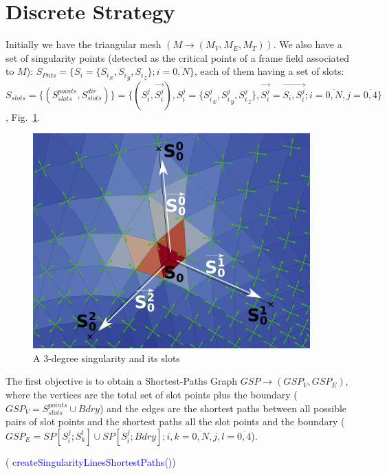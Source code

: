 \documentclass[a4paper]{report}
\begin{document}
\section{Discrete Strategy}
{
Initially we have the triangular mesh $(M \rightarrow (M_V, M_E, M_T))$. We also have a set of singularity points (detected as the critical points of a frame field associated to $M$): $S_{Pnts} = \{S_i = \{{S_i}_x, {S_i}_y, {S_i}_z \}; i=\overline{0,N}\}$, each of them having a set of slots: $S_{slots} = \{(S_{slots}^{points} , S_{slots}^{dir})\} = \{(S_i^j, \overrightarrow{S_i^j } ), S_i^j =\{{S_i^j}_x, {S_i^j}_y, {S_i^j}_z \},  \overrightarrow{S_i^j} = \overrightarrow{S_i,S_i^j } ; i=\overline{0,N} , j=\overline{0,4}\}$, Fig.~\ref{fig:singSlots}. 
\begin{figure}[h]
\includegraphics[width=0.95\textwidth]{SingSlots}
\caption{A 3-degree singularity and its slots}
\label{fig:singSlots}
\end{figure}

\medskip
 The first objective is to obtain a Shortest-Paths Graph $GSP \rightarrow (GSP_V, GSP_E)$, where the vertices are the total set of slot points plus the boundary ($GSP_V = S_{slots}^{points} \cup Bdry$) and the edges are the shortest paths between all possible pairs of slot points and the shortest paths all the slot points and the boundary ($GSP_E = SP[S_i^j; S_k^l] \cup SP[S_i^j; Bdry]; i,k=\overline{0,N}, j,l=\overline{0,4}$).

\bigskip

( \textcolor{blue}{createSingularityLinesShortestPaths()})
\newline


}
\end{document}
